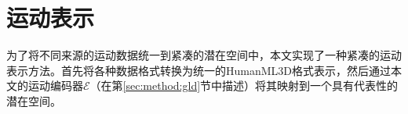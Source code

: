 \section{运动表示}
\label{sec:method:m_rep}
为了将不同来源的运动数据统一到紧凑的潜在空间中，本文实现了一种紧凑的运动表示方法。首先将各种数据格式转换为统一的HumanML3D格式表示，然后通过本文的运动编码器$\mathcal{E}$（在第\ref{sec:method:gld}节中描述）将其映射到一个具有代表性的潜在空间。

